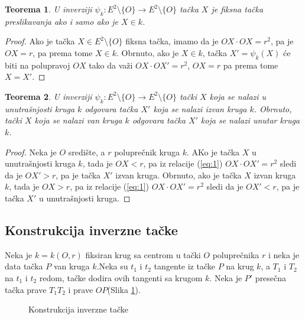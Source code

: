 \documentclass[a4paper,12pt]{article}
\newtheorem{teorema}{{Teorema}}[section]
\theoremstyle{definition}
\begin{document}
\begin{teorema}
\label{th:fiksnatacka}
U inverziji $\psi_k : E^2 \setminus \{O\}\longrightarrow E^2 \setminus \{O\}$ ta\v{c}ka $X$ je fiksna ta\v{c}ka preslikavanja ako i samo ako je $X \in k$.
\end{teorema}

\begin{proof}
Ako je ta\v{c}ka $X \in E^2 \setminus \{O\}$ fiksna ta\v{c}ka, imamo da je $OX \cdot OX=r^2$, pa je $OX=r$, pa prema tome $X \in k$. Obrnuto, ako je $X \in k$, ta\v{c}ka $X'=\psi_k(X)$ \'{c}e biti na polupravoj $OX$ tako da va\v{z}i $OX \cdot OX'=r^2$, $OX=r$ pa prema tome $X=X'$.
\end{proof}

\begin{teorema}
\label{th:slikatacke}
U inverziji $\psi_k : E^2 \setminus \{O\}\longrightarrow E^2 \setminus \{O\}$ ta\v{c}ki $X$ koja se nalazi u unutra\v{s}njosti kruga $k$ odgovara ta\v{c}ka $X'$ koja se nalazi izvan kruga $k$. Obrnuto, ta\v{c}ki $X$ koja se nalazi van kruga $k$ odgovara ta\v{c}ka $X'$ koja se nalazi unutar kruga $k$.
\end{teorema}

\begin{proof}
Neka je $O$ sredi\v{s}te, a $r$ polupre\v{c}nik kruga $k$. AKo je ta\v{c}ka $X$ u unutra\v{s}njosti kruga $k$, tada je $OX<r$, pa iz relacije (\ref{eq:1}) $OX\cdot OX'=r^2$ sledi da je $OX'>r$, pa je ta\v{c}ka $X'$ izvan kruga. Obrnuto, ako je ta\v{c}ka $X$ izvan kruga $k$, tada je $OX>r$, pa iz relacije (\ref{eq:1}) $OX\cdot OX'=r^2$ sledi da je $OX'<r$, pa je ta\v{c}ka $X'$ u unutra\v{s}njosti kruga.
\end{proof}

\subsection*{Konstrukcija inverzne ta\v{c}ke}

Neka je $k=k(O,r)$ fiksiran krug sa centrom u ta\v{c}ki $O$ polupre\v{c}nika $r$ i neka je data ta\v{c}ka $P$ van kruga $k$.Neka su $t_1$ i $t_2$ tangente iz ta\v{c}ke $P$ na krug $k$, a $T_1$ i $T_2$ na $t_1$ i $t_2$ redom, ta\v{c}ke dodira ovih tangenti sa krugom $k$. Neka je $P'$ prese\v{c}na ta\v{c}ka prave $T_1T_2$ i prave $OP$(Slika \ref{slk:konstrukcijauopsteno}).

\begin{figure}[h]
   \begin{center}
       
   \end{center}
    \caption{Konstrukcija inverzne ta\v{c}ke}
    \label{slk:konstrukcijauopsteno}
    \vspace{40pt}
\end{figure}
\end{document}
